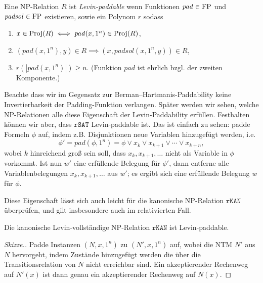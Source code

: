 \begin{definition}\label{def:levin-paddable}
    Eine NP-Relation $R$ ist \emph{Levin-paddable} wenn 
    Funktionen $\mathit{pad}\in\mathrm{FP}$ und $\mathit{padsol}\in\mathrm{FP}$ existieren, sowie ein Polynom $r$ sodass
    \begin{enumerate}
        \item $x\in \operatorname{Proj}(R) \iff \mathit{pad}(x, 1^n) \in \operatorname{Proj}(R)$,
        \item $(\mathit{pad}(x, 1^n), y)\in R \implies (x, \mathit{padsol}(x, 1^n, y)) \in R$,
        \item $r(|\mathit{pad}(x, 1^n)|)\geq n$. (Funktion $\mathit{pad}$ ist ehrlich bzgl. der zweiten Komponente.)\qedhere
    \end{enumerate}
\end{definition}
Beachte dass wir im Gegensatz zur Berman–Hartmanis-Paddability keine Invertierbarkeit der Padding-Funktion verlangen.
Später werden wir sehen, welche NP-Relationen alle diese Eigenschaft der Levin-Paddability erfüllen. Festhalten können wir aber, dass $\mathtt{rSAT}$ Levin-paddable ist. Das ist einfach zu sehen: padde Formeln $\phi$ auf, indem z.B. Disjunktionen neue Variablen hinzugefügt werden, i.e. 
\[ \phi' = \mathit{pad}(\phi, 1^n) = \phi \lor x_k \lor x_{k+1} \lor \cdots \lor x_{k+n}, \]
wobei $k$ hinreichend groß sein soll, dass $x_k, x_{k+1}, \dots$ nicht als Variable in $\phi$ vorkommt.
Ist nun $w'$ eine erfüllende Belegung für $\phi'$, dann entferne alle Variablenbelegungen $x_{k}, x_{k+1}, \dots$ aus $w'$; es ergibt sich eine erfüllende Belegung $w$ für $\phi$.

Diese Eigenschaft lässt sich auch leicht für die kanonische NP-Relation $\mathtt{rKAN}$ überprüfen, und gilt insbesondere auch im relativierten Fall.
\begin{observation}\label{obs:rkan-paddable}
    Die kanonische Levin-vollständige NP-Relation $\mathtt{rKAN}$ ist Levin-paddable.
\end{observation}
\begin{proof}[Skizze.]
    Padde Instanzen $(N, x, 1^n)$ zu $(N', x, 1^n)$ auf, wobei die NTM $N'$ aus $N$ hervorgeht, indem Zustände hinzugefügt werden die über die Transitionsrelation von $N$ nicht erreichbar sind. Ein akzeptierender Rechenweg auf $N'(x)$ ist dann genau ein akzeptierender Rechenweg auf $N(x)$.
\end{proof}


